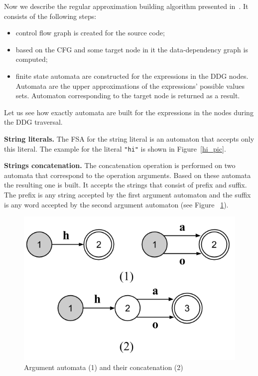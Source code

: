 \documentclass{sig-alternate-05-2015}
\begin{document}
Now we describe the regular approximation building algorithm presented in~\cite{Upper_Approximation:ref}. It consists of the following steps:
\begin{itemize}
\item control flow graph is created for the source code;
\item based on the CFG and some target node in it the data-dependency graph is computed;
\item finite state automata are constructed for the expressions in the DDG nodes. Automata are the upper approximations of the expressions' possible values sets. Automaton corresponding to the target node is returned as a result.
\end{itemize}

Let us see how exactly automata are built for the expressions in the nodes during the DDG traversal.

{\bf String literals.} The FSA for the string literal is an automaton that accepts only this literal. The example for the literal \verb|"hi"| is shown in Figure~\ref{hi_pic}.

\textbf{Strings concatenation.} The concatenation operation is performed on two automata that correspond to the operation arguments. Based on these automata the resulting one is built. It accepts the strings that consist of prefix and suffix. The prefix is any string accepted by the first argument automaton and the suffix is any word accepted by the second argument automaton (see Figure ~\ref{concat_pic}).

\begin{figure}[h!]
    \begin{center}
        \includegraphics[scale=0.3]{Figures/automata_concat.png}
    \end{center}
    \caption{Argument automata (1) and their concatenation (2)}
    \label{concat_pic}
\end{figure} 
\end{document}
